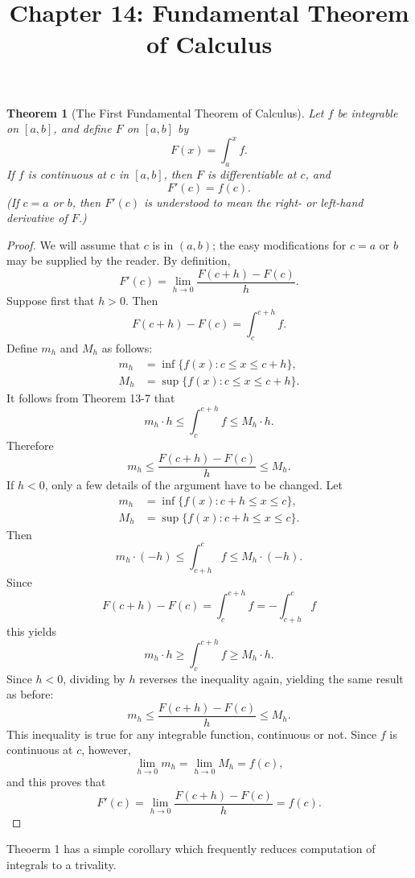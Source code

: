 \documentclass{article}
\newtheorem{theorem}{Theorem}
\begin{document}
\title{Chapter 14: Fundamental Theorem of Calculus}
\maketitle

\begin{theorem}[The First Fundamental Theorem of Calculus]
  Let $f$ be integrable on $[a, b]$, and define $F$ on $[a, b]$ by \[
    F(x) = \int_a^x f.
  \] If $f$ is continuous at $c$ in $[a, b]$, then $F$ is differentiable at
  $c$, and \[
    F'(c) = f(c).
  \] (If $c = a$ or $b$, then $F'(c)$ is understood to mean the right- or
  left-hand derivative of $F$.)
\end{theorem}
\begin{proof}
  We will assume that $c$ is in $(a, b)$; the easy modifications for $c = a$ or
  $b$ may be supplied by the reader. By definition, \[
    F'(c) = \lim_{h \to 0}\frac{F(c + h) - F(c)}{h}.
  \] Suppose first that $h > 0$. Then \[
    F(c + h) - F(c) = \int_c^{c + h} f.
  \] Define $m_h$ and $M_h$ as follows:
  \begin{align*}
    m_h &= \inf\{f(x): c \leq x \leq c + h\}, \\
    M_h &= \sup\{f(x): c \leq x \leq c + h\}.
  \end{align*}
  It follows from Theorem 13-7 that \[
    m_h \cdot h \leq \int_c^{c + h} f \leq M_h \cdot h.
  \] Therefore \[
    m_h \leq \frac{F(c + h) - F(c)}{h} \leq M_h.
  \] If $h < 0$, only a few details of the argument have to be changed. Let
  \begin{align*}
    m_h &= \inf\{f(x): c + h \leq x \leq c\}, \\
    M_h &= \sup\{f(x): c + h \leq x \leq c\}.
  \end{align*}
  Then \[
    m_h \cdot (-h) \leq \int_{c + h}^c f \leq M_h \cdot (-h).
  \] Since \[
    F(c + h) - F(c) = \int_c^{c + h} f = -\int_{c + h}^c f
  \] this yields \[
    m_h \cdot h \geq \int_c^{c + h} f \geq M_h \cdot h.
  \] Since $h < 0$, dividing by $h$ reverses the inequality again, yielding the
  same result as before: \[
    m_h \leq \frac{F(c + h) - F(c)}{h} \leq M_h.
  \] This inequality is true for any integrable function, continuous or not.
  Since $f$ is continuous at $c$, however, \[
    \lim_{h \to 0} m_h = \lim_{h \to 0} M_h = f(c),
  \] and this proves that \[
    F'(c) = \lim_{h \to 0} \frac{F(c + h) - F(c)}{h} = f(c).
  \]
\end{proof}

Theoerm 1 has a simple corollary which frequently reduces computation of
integrals to a trivality.
\end{document}
